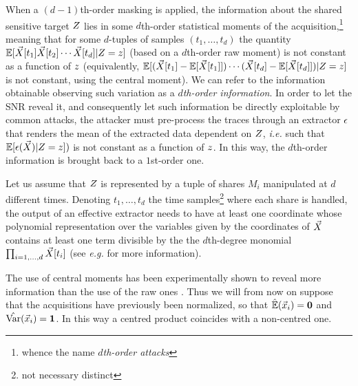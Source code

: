 When a $(d-1)$th-order masking is applied, the information about the shared sensitive target $Z$ lies in some $d$th-order statistical moments of the acquisition,\footnote{whence the name {\em $d$th-order attacks}} meaning that for some $d$-tuples of samples $(t_1,\dots ,t_d)$ the quantity $\mathbb{E}[\vec{X}[t_1]\vec{X}[t_2]\cdots \vec{X}[t_d]\vert Z=z]$ (based on a $d$th-order raw moment) is not constant as a function of $z$ (equivalently, $ \mathbb{E}[(\vec{X}[t_1]-\mathbb{E}[\vec{X}[t_1]])\cdots (\vec{X}[t_d]-\mathbb{E}[\vec{X}[t_d]])\vert Z=z]$ is not constant, using the central moment). We can refer to the information obtainable observing such variation as a {\em $d$th-order information}.
In order to let the SNR reveal it, and consequently let such information be directly exploitable by common attacks, the attacker must pre-process the traces through an extractor $\epsilon$ that renders the mean of the extracted data dependent on $Z$, \emph{i.e.} such that $\mathbb{E}[\epsilon(\vec{X})\vert Z=z])$ is not constant as a function of $z$. In this way, the $d$th-order information is brought back to a $1$st-order one.

\begin{property}\label{property:poly}
Let us assume that $Z$ is represented by a tuple of shares $M_i$ manipulated at $d$ different times. Denoting $t_1,\dots,t_d$ the time samples\footnote{not necessary distinct} where each share is handled, the output of an effective extractor needs to have at least one coordinate whose polynomial representation over the variables given by the coordinates of $\vec{X}$ contains at least one term divisible by the the $d$th-degree monomial $\prod_{i=1,\dots,d}\vec{X}[t_i]$ (see \emph{e.g.} \cite{carlet2014achieving} for more information).
\end{property}


\begin{remark}\label{remark:normalized}
The use of central moments has been experimentally shown to reveal more information than the use of the raw ones \cite{chari1999towards,DBLP:journals/tc/ProuffRB09}. Thus we will from now on suppose that the acquisitions have previously been normalized, so that $\hat{\mathbb{E}}(\vec{x}_i) = \boldsymbol{0}$ and $\hat{\mathrm{Var}}(\vec{x}_i) = \boldsymbol{1}$. In this way a centred product coincides with a non-centred one. 
\end{remark}

